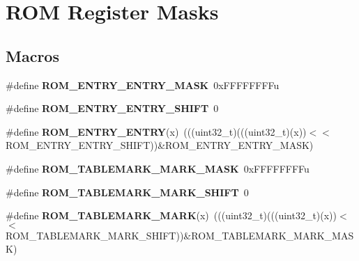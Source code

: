 \hypertarget{group___r_o_m___register___masks}{}\section{R\+OM Register Masks}
\label{group___r_o_m___register___masks}
\subsection*{Macros}
\begin{DoxyCompactItemize}
\item 
\mbox{\label{group___r_o_m___register___masks_ga1857448185c74895d4ba462f8ebd76a9}} 
\#define {\bfseries R\+O\+M\+\_\+\+E\+N\+T\+R\+Y\+\_\+\+E\+N\+T\+R\+Y\+\_\+\+M\+A\+SK}~0x\+F\+F\+F\+F\+F\+F\+F\+Fu
\item 
\mbox{\label{group___r_o_m___register___masks_gaef045dcd4648ca2c223f191d1e013673}} 
\#define {\bfseries R\+O\+M\+\_\+\+E\+N\+T\+R\+Y\+\_\+\+E\+N\+T\+R\+Y\+\_\+\+S\+H\+I\+FT}~0
\item 
\mbox{\label{group___r_o_m___register___masks_gaffee58a0a8c0c3f652a6f88007194dc8}} 
\#define {\bfseries R\+O\+M\+\_\+\+E\+N\+T\+R\+Y\+\_\+\+E\+N\+T\+RY}(x)~(((uint32\+\_\+t)(((uint32\+\_\+t)(x))$<$$<$R\+O\+M\+\_\+\+E\+N\+T\+R\+Y\+\_\+\+E\+N\+T\+R\+Y\+\_\+\+S\+H\+I\+FT))\&R\+O\+M\+\_\+\+E\+N\+T\+R\+Y\+\_\+\+E\+N\+T\+R\+Y\+\_\+\+M\+A\+SK)
\item 
\mbox{\label{group___r_o_m___register___masks_gaac600c2f3e33e425e374ca4f843d63e6}} 
\#define {\bfseries R\+O\+M\+\_\+\+T\+A\+B\+L\+E\+M\+A\+R\+K\+\_\+\+M\+A\+R\+K\+\_\+\+M\+A\+SK}~0x\+F\+F\+F\+F\+F\+F\+F\+Fu
\item 
\mbox{\label{group___r_o_m___register___masks_gaffb544cfa94716cfd71a99bb45c7411a}} 
\#define {\bfseries R\+O\+M\+\_\+\+T\+A\+B\+L\+E\+M\+A\+R\+K\+\_\+\+M\+A\+R\+K\+\_\+\+S\+H\+I\+FT}~0
\item 
\mbox{\label{group___r_o_m___register___masks_ga38bfb1952b2f112abc1e01ce0d2d24b1}} 
\#define {\bfseries R\+O\+M\+\_\+\+T\+A\+B\+L\+E\+M\+A\+R\+K\+\_\+\+M\+A\+RK}(x)~(((uint32\+\_\+t)(((uint32\+\_\+t)(x))$<$$<$R\+O\+M\+\_\+\+T\+A\+B\+L\+E\+M\+A\+R\+K\+\_\+\+M\+A\+R\+K\+\_\+\+S\+H\+I\+FT))\&R\+O\+M\+\_\+\+T\+A\+B\+L\+E\+M\+A\+R\+K\+\_\+\+M\+A\+R\+K\+\_\+\+M\+A\+SK)

\end{DoxyCompactItemize}
